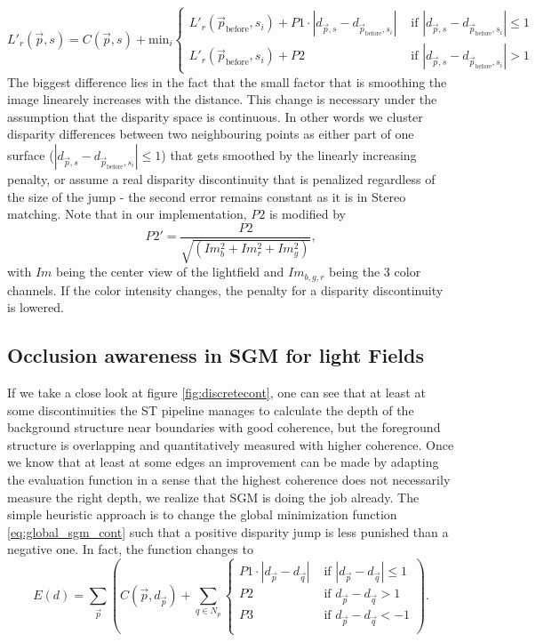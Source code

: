 \documentclass  [
  paper    = a4,
  BCOR     = 10mm,
  twoside,
  fontsize = 12pt,
  fleqn,
  toc      = bibnumbered,
  toc      = listofnumbered,
  numbers  = noendperiod,
  headings = normal,
  listof   = leveldown,
  version  = 3.03
]                                       {scrreprt}
\begin{document}
\begin{equation}\label{key}
L'_r(\vec{p}, s) = C(\vec{p}, s) + \text{min}_i
\begin{cases}
L'_r(\vec{p}_\text{before}, s_i)+P1 \cdot |d_{\vec p, s} - d_{\vec{p}_\text{before}, s_i}|  & \text{ if }|d_{\vec p, s} - d_{\vec{p}_\text{before}, s_i}| \leq 1 \\
L'_r(\vec{p}_\text{before}, s_i)+P2 & \text{ if }|d_{\vec p, s} - d_{\vec{p}_\text{before}, s_i}| > 1
\end{cases}
\end{equation} 
The biggest difference lies in the fact that the small factor that is smoothing the image linearely increases with the distance. This change is necessary under the assumption that the disparity space is continuous. In other words we cluster disparity differences between two neighbouring points as either part of one surface ($|d_{\vec p, s} - d_{\vec{p}_\text{before}, s_i}| \leq 1$) that gets smoothed by the linearly increasing penalty, or assume a real disparity discontinuity that is penalized regardless of the size of the jump - the second error remains constant as it is in Stereo matching. Note that in our implementation, $P2$ is modified by 
\begin{equation}\label{key}
P2' =  \frac{P2}{\sqrt{(Im_b^2 +Im_r^2 + Im_g^2)}},
\end{equation}
with $Im$ being the center view of the lightfield and $Im_{b,g,r}$ being the 3 color channels. If the color intensity changes, the penalty for a disparity discontinuity is lowered.

\subsection{Occlusion awareness in SGM for light Fields}

If we take a close look at figure \ref{fig:discretecont}, one can see that at least at some discontinuities the ST pipeline manages to calculate the depth of the background structure near boundaries with good coherence, but the foreground structure is overlapping and quantitatively measured with higher coherence. Once we know that at least at some edges an improvement can be made by adapting the evaluation function in a sense that the highest coherence does not necessarily measure the right depth, we realize that SGM is doing the job already. The simple heuristic approach is to change the global minimization function \ref{eq:global_sgm_cont} such that a positive disparity jump is less punished than a negative one. In fact, the function changes to
\begin{equation}\label{eq:global_sgm_cont_occlusion}
E(d) = \sum_{\vec p} \left(C(\vec{p}, d_{\vec p}) + \sum_{q\in N_p} 
\begin{cases}
P1\cdot |d_{\vec p} - d_{\vec q}|  & \text{ if }|d_{\vec p} - d_{\vec q}| \leq 1\\
P2 & \text{ if }d_{\vec p} - d_{\vec q} > 1\\
P3 & \text{ if }d_{\vec p} - d_{\vec q} < -1\\
\end{cases}  
\right).
\end{equation}
\end{document}
